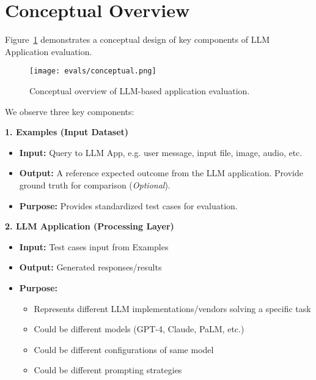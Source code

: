\section{Conceptual Overview}

Figure~\ref{fig:conceptual} demonstrates a conceptual design of key components of LLM Application evaluation.

\begin{figure}[h]
\centering
\texttt{[image: evals/conceptual.png]}
\caption{Conceptual overview of LLM-based application evaluation.}
\label{fig:conceptual}
\end{figure}
We observe three key components:

\textbf{1. Examples (Input Dataset)}
\begin{itemize}
    \item \textbf{Input:} Query to LLM App, e.g. user message, input file, image, audio, etc.
    \item \textbf{Output:} A reference expected outcome from the LLM application. Provide ground truth for comparison (\textit{Optional}).
    \item \textbf{Purpose:} Provides standardized test cases for evaluation.
\end{itemize}

\textbf{2. LLM Application (Processing Layer)}
\begin{itemize}
    \item \textbf{Input:} Test cases input from Examples
    \item \textbf{Output:} Generated responses/results
    \item \textbf{Purpose:}
    \begin{itemize}
        \item Represents different LLM implementations/vendors solving a specific task
        \item Could be different models (GPT-4, Claude, PaLM, etc.)
        \item Could be different configurations of same model
        \item Could be different prompting strategies
    \end{itemize}
\end{itemize}

